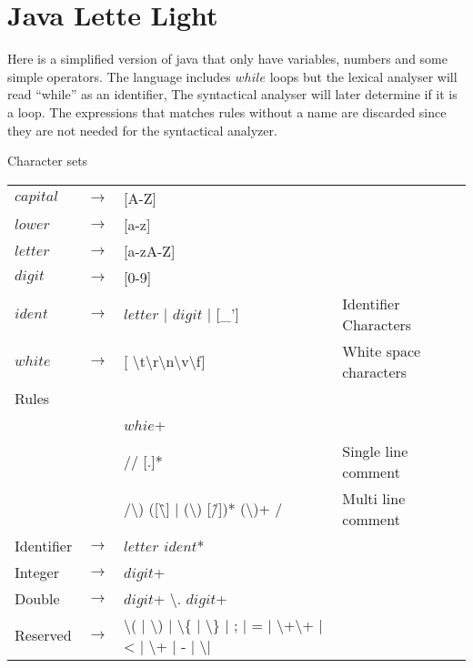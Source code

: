 \chapter{Java Lette Light}\label{reglang}
Here is a simplified version of java that only have variables, numbers and some
simple operators. The language includes $while$ loops but the lexical analyser
will read ``while'' as an identifier, The syntactical analyser will later
determine if it is a loop. The expressions that matches rules without a name
are discarded since they are not needed for the syntactical analyzer.

Character sets\\
\begin{tabular}{l c l l}
$capital$ & $\rightarrow$ & [A-Z]\\
$lower$   & $\rightarrow$ & [a-z]\\
$letter$  & $\rightarrow$ & [a-zA-Z]\\
$digit$   & $\rightarrow$ & [0-9]\\
$ident$   & $\rightarrow$ & $letter$ | $digit$ | [\_'] & Identifier Characters\\
$white$   & $\rightarrow$ & [ \textbackslash{t}\textbackslash{r}\textbackslash{n}\textbackslash{v}\textbackslash{f}] & White space characters\\
Rules\\
& & $whie$+\\
& & // [.]* & Single line comment\\
& & /\textbackslash*) ([\^\textbackslash*] | (\textbackslash*) [\^/])*
    (\textbackslash*)+ / & Multi line comment\\
Identifier & $\rightarrow$ & $letter$ $ident$*\\
Integer    & $\rightarrow$ & $digit$+\\
Double     & $\rightarrow$ & $digit$+ \textbackslash. $digit$+\\
Reserved   & $\rightarrow$ & \textbackslash( | \textbackslash) | \textbackslash\{
                         | \textbackslash\} | ; | = | \textbackslash+\textbackslash+
                         | < | \textbackslash+ | - | \textbackslash* | \/ \\ %
\end{tabular}
